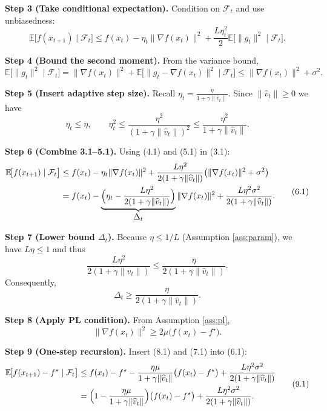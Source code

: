 \documentclass{article}
\newcommand{\E}{\mathbb{E}}
\begin{document}
\noindent\textbf{Step 3 (Take conditional expectation).}  
Condition on $\mathcal{F}_{t}$ and use unbiasedness:
\[
    \E\!\bigl[f(x_{t+1})\mid\mathcal{F}_{t}\bigr]
    \le f(x_{t}) -\eta_{t}\|\nabla f(x_{t})\|^{2}
        +\frac{L\eta_{t}^{2}}{2}\E\!\bigl[\|g_{t}\|^{2}\mid\mathcal{F}_{t}\bigr].
    \tag{3.1}
\]

\noindent\textbf{Step 4 (Bound the second moment).}  
From the variance bound,
\[
    \E\!\bigl[\|g_{t}\|^{2}\mid\mathcal{F}_{t}\bigr]
    =\|\nabla f(x_{t})\|^{2}+ \E\!\bigl[\|g_{t}-\nabla f(x_{t})\|^{2}\mid\mathcal{F}_{t}\bigr]
    \le \|\nabla f(x_{t})\|^{2}+\sigma^{2}.
    \tag{4.1}
\]

\noindent\textbf{Step 5 (Insert adaptive step size).}  
Recall $\eta_{t}= \frac{\eta}{1+\gamma\|\widehat v_{t}\|}$. Since $\|\widehat v_{t}\|\ge0$ we have
\[
    \eta_{t}\le\eta,\qquad
    \eta_{t}^{2}\le\frac{\eta^{2}}{(1+\gamma\|\widehat v_{t}\|)^{2}}
    \le\frac{\eta^{2}}{1+\gamma\|\widehat v_{t}\|}.
    \tag{5.1}
\]

\noindent\textbf{Step 6 (Combine 3.1–5.1).}  
Using (4.1) and (5.1) in (3.1):
\[
\begin{aligned}
    \E\!\bigl[f(x_{t+1})\mid\mathcal{F}_{t}\bigr]
    &\le f(x_{t}) -\eta_{t}\|\nabla f(x_{t})\|^{2}
        +\frac{L\eta^{2}}{2(1+\gamma\|\widehat v_{t}\|)}\bigl(\|\nabla f(x_{t})\|^{2}+\sigma^{2}\bigr)\\
    &= f(x_{t}) -\underbrace{\Bigl(\eta_{t}-\frac{L\eta^{2}}{2(1+\gamma\|\widehat v_{t}\|)}\Bigr)}_{\displaystyle\Delta_{t}}\|\nabla f(x_{t})\|^{2}
        +\frac{L\eta^{2}\sigma^{2}}{2(1+\gamma\|\widehat v_{t}\|)} .
\end{aligned}
\tag{6.1}
\]

\noindent\textbf{Step 7 (Lower bound $\Delta_{t}$).}  
Because $\eta\le 1/L$ (Assumption \ref{ass:param}), we have $L\eta\le1$ and thus
\[
    \frac{L\eta^{2}}{2(1+\gamma\|\widehat v_{t}\|)}\le\frac{\eta}{2(1+\gamma\|\widehat v_{t}\|)}.
\]
Consequently,
\[
    \Delta_{t}\ge \frac{\eta}{2(1+\gamma\|\widehat v_{t}\|)} .
    \tag{7.1}
\]

\noindent\textbf{Step 8 (Apply PL condition).}  
From Assumption \ref{ass:pl},
\[
    \|\nabla f(x_{t})\|^{2}\ge 2\mu\bigl(f(x_{t})-f^{\star}\bigr).
    \tag{8.1}
\]

\noindent\textbf{Step 9 (One‑step recursion).}  
Insert (8.1) and (7.1) into (6.1):
\[
\begin{aligned}
    \E\!\bigl[f(x_{t+1})-f^{\star}\mid\mathcal{F}_{t}\bigr]
    &\le f(x_{t})-f^{\star}
        -\frac{\eta\mu}{1+\gamma\|\widehat v_{t}\|}\bigl(f(x_{t})-f^{\star}\bigr)
        +\frac{L\eta^{2}\sigma^{2}}{2(1+\gamma\|\widehat v_{t}\|)}\\
    &=\Bigl(1-\frac{\eta\mu}{1+\gamma\|\widehat v_{t}\|}\Bigr)\bigl(f(x_{t})-f^{\star}\bigr)
        +\frac{L\eta^{2}\sigma^{2}}{2(1+\gamma\|\widehat v_{t}\|)} .
\end{aligned}
\tag{9.1}
\]
\end{document}
